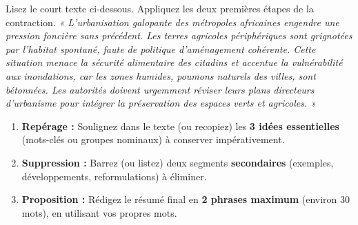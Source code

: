 \documentclass[11pt]{article}
\begin{document}
\begin{exercice}
Lisez le court texte ci-dessous. Appliquez les deux premières étapes de la contraction.
\textit{« L'urbanisation galopante des métropoles africaines engendre une pression foncière sans précédent. Les terres agricoles périphériques sont grignotées par l'habitat spontané, faute de politique d'aménagement cohérente. Cette situation menace la sécurité alimentaire des citadins et accentue la vulnérabilité aux inondations, car les zones humides, poumons naturels des villes, sont bétonnées. Les autorités doivent urgemment réviser leurs plans directeurs d'urbanisme pour intégrer la préservation des espaces verts et agricoles. »}
\begin{enumerate}
    \item \textbf{Repérage :} Soulignez dans le texte (ou recopiez) les \textbf{3 idées essentielles} (mots-clés ou groupes nominaux) à conserver impérativement.
    \item \textbf{Suppression :} Barrez (ou listez) deux segments \textbf{secondaires} (exemples, développements, reformulations) à éliminer.
    \item \textbf{Proposition :} Rédigez le résumé final en \textbf{2 phrases maximum} (environ 30 mots), en utilisant vos propres mots.
\end{enumerate}
\end{exercice}
\end{document}
